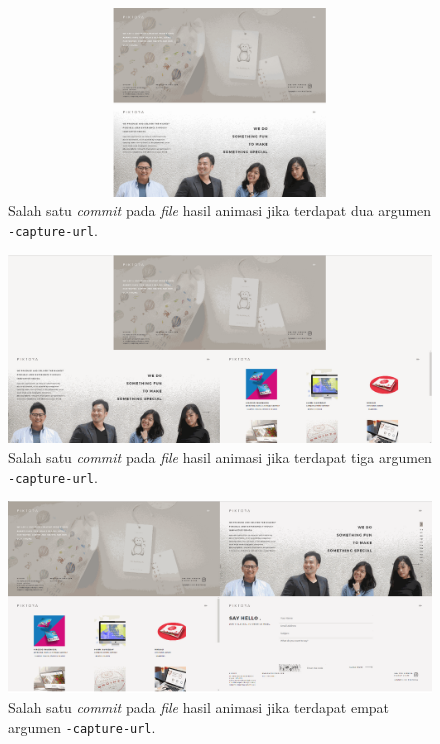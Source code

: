 \begin{figure}[H]
	\centering
		\includegraphics[scale=0.3]{Gambar/capture2.png}
	\caption{Salah satu \textit{commit} pada \textit{file} hasil animasi jika terdapat dua argumen \texttt{-capture-url}.}
	\label{fig:capture2}
\end{figure}



\begin{figure}[H]
	\centering
		\includegraphics[scale=0.3]{Gambar/capture3.png}
	\caption{Salah satu \textit{commit} pada \textit{file} hasil animasi jika terdapat tiga argumen \texttt{-capture-url}.}
	\label{fig:capture3}
\end{figure}


\begin{figure}[H]
	\centering
		\includegraphics[scale=0.3]{Gambar/capture4.png}
	\caption{Salah satu \textit{commit} pada \textit{file} hasil animasi jika terdapat empat argumen \texttt{-capture-url}.}
	\label{fig:capture4}
\end{figure}




